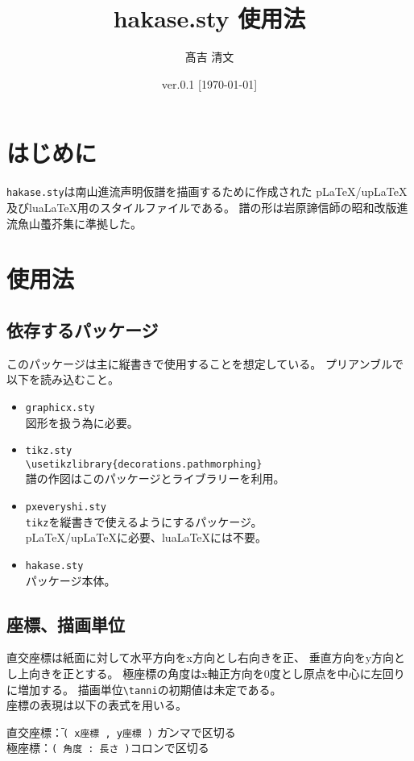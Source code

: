 \documentclass[a4paper,luatex]{l3doc}
\title{hakase.sty 使用法}
\author{髙吉 清文}
\date{ver.0.1 [\today]}
\begin{document}
\maketitle
\section{はじめに}
\verb|hakase.sty|は南山進流声明仮譜を描画するために作成された
p\LaTeX/up\LaTeX 及びlua\LaTeX 用のスタイルファイルである。
譜の形は岩原諦信師の昭和改版進流魚山蠆芥集に準拠した。
\section{使用法}
\subsection{依存するパッケージ}
このパッケージは主に縦書きで使用することを想定している。
プリアンブルで以下を読み込むこと。
\begin{itemize}
 \item \verb|graphicx.sty|\\
       図形を扱う為に必要。
 \item \verb|tikz.sty|\\
       \verb|\usetikzlibrary{decorations.pathmorphing}|\\
       譜の作図はこのパッケージとライブラリーを利用。\\
 \item \verb|pxeveryshi.sty|\\
       \verb|tikz|を縦書きで使えるようにするパッケージ。\\
       p\LaTeX/up\LaTeX に必要、lua\LaTeX には不要。
 \item \verb|hakase.sty|\\
       パッケージ本体。
\end{itemize}
\subsection{座標、描画単位}
直交座標は紙面に対して水平方向をx方向とし右向きを正、
垂直方向をy方向とし上向きを正とする。
極座標の角度はx軸正方向を0度とし原点を中心に左回りに増加する。
描画単位\verb|\tanni|の初期値は未定である。\\
座標の表現は以下の表式を用いる。
\begin{tabbing}
直交座標\=：\=\verb|( x座標 , y座標 )|  \=カンマで区切る \\
極座標\>：\>\verb|( 角度 : 長さ )|\>コロンで区切る	
\end{tabbing}
\end{document}

